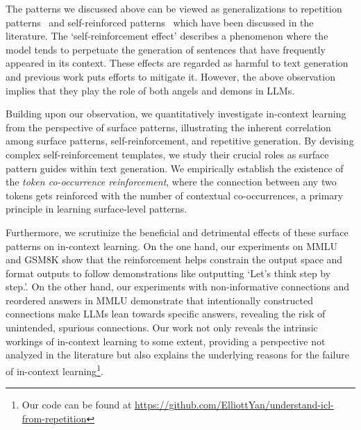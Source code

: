 \documentclass{article} %
\begin{document}
The patterns we discussed above can be viewed as generalizations to repetition patterns~\citep{holtzman2019curious,fu2020theoretical} and self-reinforced patterns~\citep{xu2022learning} which have been discussed in the literature.
The `self-reinforcement effect' describes a phenomenon where the model tends to perpetuate the generation of sentences that have frequently appeared in its context. 
These effects are regarded as harmful to text generation and previous work puts efforts to mitigate it. 
However, the above observation implies that they play the role of both angels and demons in LLMs.

Building upon our observation, we quantitatively investigate in-context learning from the perspective of surface patterns, illustrating the inherent correlation among surface patterns, self-reinforcement, and repetitive generation.
By devising complex self-reinforcement templates, we study their crucial roles as surface pattern guides within text generation.
We empirically establish the existence of the \emph{token co-occurrence reinforcement}, where the connection between any two tokens gets reinforced with the number of contextual co-occurrences, a primary principle in learning surface-level patterns. 

Furthermore, we scrutinize the beneficial and detrimental effects of these surface patterns on in-context learning.
On the one hand, our experiments on MMLU and GSM8K show that the reinforcement helps constrain the output space and format outputs to follow demonstrations like outputting `Let's think step by step.'. On the other hand, our experiments with non-informative connections and reordered answers in MMLU demonstrate that intentionally constructed connections make LLMs lean towards specific answers, revealing the risk of unintended, spurious connections. 
Our work not only reveals the intrinsic workings of in-context learning to some extent, providing a perspective not analyzed in the literature but also explains the underlying reasons for the failure of in-context learning\footnote{Our code can be found at \url{https://github.com/ElliottYan/understand-icl-from-repetition}}.


\end{document}
